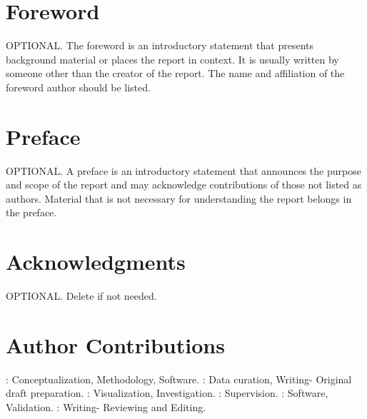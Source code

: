 \begin{titlepage}
 
 \tagpdfparaOff {} 
\section*{Foreword}
 \tagmcend
 \tagstructend
 \tagpdfparaOn
OPTIONAL. The foreword is an introductory statement that presents background material or places the report in context. It is usually written by someone other than the creator of the report. The name and affiliation of the foreword author should be listed.
 
 \tagpdfparaOff {}
\section*{Preface}
\tagmcend
 \tagstructend
 \tagpdfparaOn
OPTIONAL. A preface is an introductory statement that announces the purpose and scope of the report and may acknowledge contributions of those not listed as authors. Material that is not necessary for understanding the report belongs in the preface. 
 
 \tagpdfparaOff {}
\section*{Acknowledgments}
\tagmcend
 \tagstructend
 \tagpdfparaOn
OPTIONAL. Delete if not needed.
 
 \tagpdfparaOff {}
\section*{Author Contributions}
\tagmcend
 \tagstructend
\tagpdfparaOn

\textbf{\authorone}: Conceptualization, Methodology, Software. \textbf{\authortwo}: Data curation, Writing- Original draft preparation. \textbf{\authorthree}: Visualization, Investigation. \textbf{\authorfour}: Supervision. \textbf{\authorfive}: Software, Validation. \textbf{\authorsix}: Writing- Reviewing and Editing.
 

\end{titlepage}
\pagestyle{fancy}
\renewcommand{\headrulewidth}{0pt}
\ExplSyntaxOn
  \fancyhead{}
  \fancyhead[l]{\small \pubnumber \\ 
	\small \pubmonth~\pubyear \\}
   \tagmcend
\ExplSyntaxOff
{}

